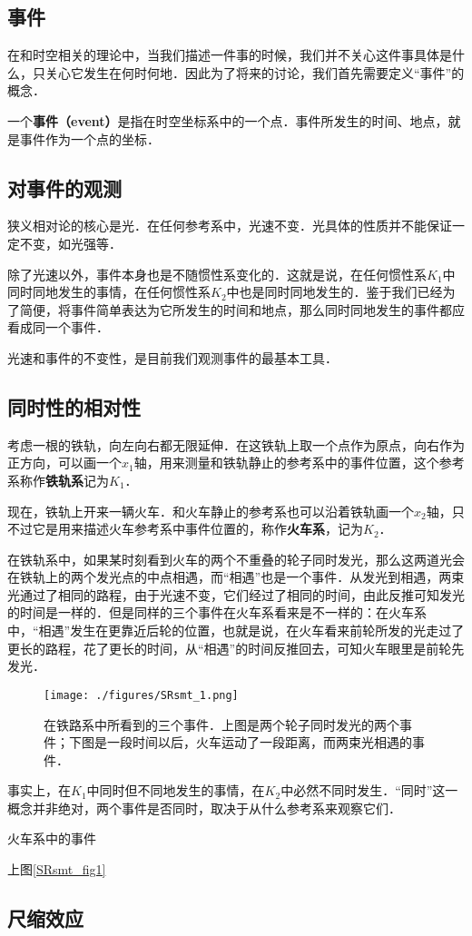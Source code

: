 

\subsection{事件}

在和时空相关的理论中，当我们描述一件事的时候，我们并不关心这件事具体是什么，只关心它发生在何时何地．因此为了将来的讨论，我们首先需要定义“事件”的概念．

一个\textbf{事件（event）}是指在时空坐标系中的一个点．事件所发生的时间、地点，就是事件作为一个点的坐标．

\subsection{对事件的观测}

狭义相对论的核心是光．在任何参考系中，光速不变．光具体的性质并不能保证一定不变，如光强等．

除了光速以外，事件本身也是不随惯性系变化的．这就是说，在任何惯性系$K_1$中同时同地发生的事情，在任何惯性系$K_2$中也是同时同地发生的．鉴于我们已经为了简便，将事件简单表达为它所发生的时间和地点，那么同时同地发生的事件都应看成同一个事件．

光速和事件的不变性，是目前我们观测事件的最基本工具．

\subsection{同时性的相对性}

考虑一根的铁轨，向左向右都无限延伸．在这铁轨上取一个点作为原点，向右作为正方向，可以画一个$x_1$轴，用来测量和铁轨静止的参考系中的事件位置，这个参考系称作\textbf{铁轨系}记为$K_1$．

现在，铁轨上开来一辆火车．和火车静止的参考系也可以沿着铁轨画一个$x_2$轴，只不过它是用来描述火车参考系中事件位置的，称作\textbf{火车系}，记为$K_2$．

在铁轨系中，如果某时刻看到火车的两个不重叠的轮子同时发光，那么这两道光会在铁轨上的两个发光点的中点相遇，而“相遇”也是一个事件．从发光到相遇，两束光通过了相同的路程，由于光速不变，它们经过了相同的时间，由此反推可知发光的时间是一样的．但是同样的三个事件在火车系看来是不一样的：在火车系中，“相遇”发生在更靠近后轮的位置，也就是说，在火车看来前轮所发的光走过了更长的路程，花了更长的时间，从“相遇”的时间反推回去，可知火车眼里是前轮先发光．

\begin{figure}[ht]
\centering
\texttt{[image: ./figures/SRsmt\_1.png]}
\caption{在铁路系中所看到的三个事件．上图是两个轮子同时发光的两个事件；下图是一段时间以后，火车运动了一段距离，而两束光相遇的事件．} \label{SRsmt_fig1}
\end{figure}

事实上，在$K_1$中同时但不同地发生的事情，在$K_2$中必然不同时发生．“同时”这一概念并非绝对，两个事件是否同时，取决于从什么参考系来观察它们．

\begin{exercise}{火车系中的事件}

上图\autoref{SRsmt_fig1}

\end{exercise}

\subsection{尺缩效应}

